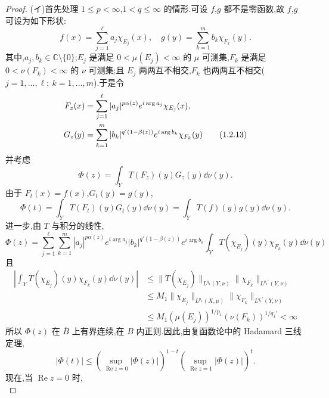 \begin{proof}
(イ)首先处理 $1 \leq p < \infty$,$1 < q \leq \infty$ 的情形.可设 $f$,$g$ 都不是零函数,故 $f$,$g$ 可设为如下形状:
\begin{equation*}
f(x) = \sum_{j=1}^{\ell} a_{j}\chi_{E_{j}}(x), \quad g(y) = \sum_{k=1}^{m} b_{k}\chi_{F_{k}}(y).
\end{equation*}
其中,$a_{j}, b_{k} \in \mathbb{C}\setminus\{0\}$;$E_{j}$ 是满足 $0 < \mu(E_{j}) < \infty$ 的 $\mu$ 可测集,$F_{k}$ 是满足 $0 < \nu(F_{k}) < \infty$ 的 $\nu$ 可测集;且 $E_{j}$ 两两互不相交,$F_{k}$ 也两两互不相交($j = 1, \ldots, \ell;\ k = 1, \ldots, m$).于是令
\begin{align}
F_{z}(x) & = \sum_{j=1}^{\ell}|a_{j}|^{p\alpha(z)}e^{i\arg a_{j}}\chi_{E_{j}}(x), \notag \\
G_{z}(y) & = \sum_{k=1}^{m}|b_{k}|^{q'(1 - \beta(z))}e^{i\arg b_{k}}\chi_{F_{k}}(y) \tag{1.2.13}\label{eq:1.2.13}
\end{align}
并考虑
\begin{equation*}
\Phi(z) = \int_{Y} T(F_{z})(y)G_{z}(y)\dd \nu(y).
\end{equation*}
由于 $F_{t}(x) = f(x)$,$G_{t}(y) = g(y)$,
\begin{equation}\tag{1.2.14}
\Phi(t) = \int_{Y} T(F_{t})(y)G_{t}(y)\dd \nu(y) = \int_{Y} T(f)(y)g(y)\dd \nu(y).
\label{eq:1.2.14}\end{equation}
进一步,由 $T$ 与积分的线性,
\begin{equation*}
\Phi(z) = \sum_{j=1}^{\ell}\sum_{k=1}^{m}|a_{j}|^{p\alpha(z)}e^{i\arg a_{j}}|b_{k}|^{q'(1 - \beta(z))}e^{i\arg b_{k}}\int_{Y} T(\chi_{E_{j}})(y)\chi_{F_{k}}(y)\dd \nu(y)
\end{equation*}
且
\begin{align*}
\left|\int_{Y} T(\chi_{E_{j}})(y)\chi_{F_{k}}(y)\dd \nu(y)\right| & \leq \| T(\chi_{E_{j}}) \|_{L^{q_{1}}(Y, \nu)}\| \chi_{F_{k}} \|_{L^{q_{1}'}(Y, \nu)} \\
& \leq M_{1}\| \chi_{E_{j}} \|_{L^{p_{1}}(X, \mu)}\| \chi_{F_{k}} \|_{L^{q_{1}'}(Y, \nu)} \\
& \leq M_{1}(\mu(E_{j}))^{1/p_{1}}(\nu(F_{k}))^{1/q_{1}'} < \infty
\end{align*}
所以 $\Phi(z)$ 在 $\overline{B}$ 上有界连续,在 $B$ 内正则.因此,由复函数论中的 Hadamard 三线定理,
\begin{equation}\tag{1.2.15}
|\Phi(t)| \leq \left(\sup_{\operatorname{Re} z = 0}|\Phi(z)|\right)^{1-t}\left(\sup_{\operatorname{Re} z = 1}|\Phi(z)|\right)^{t}.
\label{eq:1.2.15}\end{equation}
现在,当 $\operatorname{Re} z = 0$ 时,
\begin{equation*}

\end{equation*}
\end{proof}
